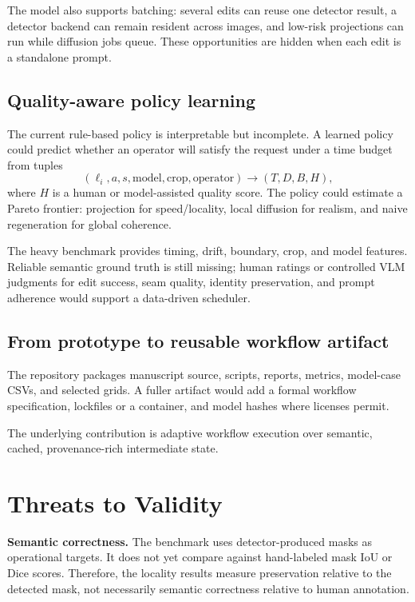 \documentclass[final,5p,times,number,sort&compress]{elsarticle}
\begin{document}
The model also supports batching: several edits can reuse one detector result, a detector backend can remain resident across images, and low-risk projections can run while diffusion jobs queue. These opportunities are hidden when each edit is a standalone prompt.

\subsection{Quality-aware policy learning}

The current rule-based policy is interpretable but incomplete. A learned policy could predict whether an operator will satisfy the request under a time budget from tuples
\begin{equation}
    (\ell_i, a, s, \mathrm{model}, \mathrm{crop}, \mathrm{operator})
    \rightarrow
    (T, D, B, H),
\end{equation}
where \(H\) is a human or model-assisted quality score. The policy could estimate a Pareto frontier: projection for speed/locality, local diffusion for realism, and naive regeneration for global coherence.

The heavy benchmark provides timing, drift, boundary, crop, and model features. Reliable semantic ground truth is still missing; human ratings or controlled VLM judgments for edit success, seam quality, identity preservation, and prompt adherence would support a data-driven scheduler.

\subsection{From prototype to reusable workflow artifact}

The repository packages manuscript source, scripts, reports, metrics, model-case CSVs, and selected grids. A fuller artifact would add a formal workflow specification, lockfiles or a container, and model hashes where licenses permit.

The underlying contribution is adaptive workflow execution over semantic, cached, provenance-rich intermediate state.

\section{Threats to Validity}

\textbf{Semantic correctness.} The benchmark uses detector-produced masks as operational targets. It does not yet compare against hand-labeled mask IoU or Dice scores. Therefore, the locality results measure preservation relative to the detected mask, not necessarily semantic correctness relative to human annotation.
\end{document}
